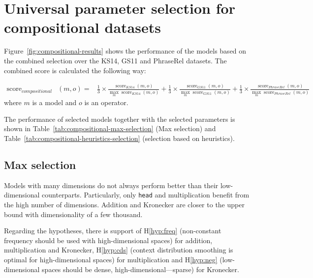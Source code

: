 \section{Universal parameter selection for compositional datasets}
\label{sec:robust-param-comp-selecion}

Figure~\ref{fig:compositional-results} shows the performance of the models based on the combined selection over the KS14, GS11 and PhraseRel datasets. The combined score is calculated the following way:

{
\scriptsize
\begin{align}
\operatorname{score}_\mathit{compositional}&(\mathit{m}, \mathit{o}) =
&\frac{1}{3}\times%
\frac{\operatorname{score}_\mathit{KS14}(\mathit{m}, \mathit{o})}%
{\max_m\operatorname{score}_\mathit{KS14}(m, \mathit{o})}%
+%
\frac{1}{3}\times%
\frac{\operatorname{score}_\mathit{GS11}(\mathit{m}, \mathit{o})}%
{\max_m\operatorname{score}_\mathit{GS11}(m, \mathit{o})}%
+%
\frac{1}{3}\times%
\frac{\operatorname{score}_\mathit{PhraseRel}(\mathit{m, \mathit{o}})}%
{\max_m\operatorname{score}_\mathit{PhraseRel}(m, \mathit{o})}%
\end{align}
}
where $m$ is a model and $o$ is an operator.

The performance of selected models together with the selected parameters is shown in Table~\ref{tab:compositional-max-selection} (Max selection) and Table~\ref{tab:compositional-heuristics-selection} (selection based on heuristics).



\subsection{Max selection}
\label{sec:max-selection-compositional}

Models with many dimensions do not always perform better than their low-dimensional counterparts. Particularly, only \texttt{head} and multiplication benefit from the high number of dimensions. Addition and Kronecker are closer to the upper bound with dimensionality of a few thousand.

Regarding the hypotheses, there is support of H\ref{hyp:freq} (non-constant frequency should be used with high-dimensional spaces) for addition, multiplication and Kronecker, H\ref{hyp:cds} (context distribution smoothing is optimal for high-dimensional spaces) for multiplication and H\ref{hyp:neg} (low-dimensional spaces should be dense, high-dimensional---sparse) for Kronecker.

